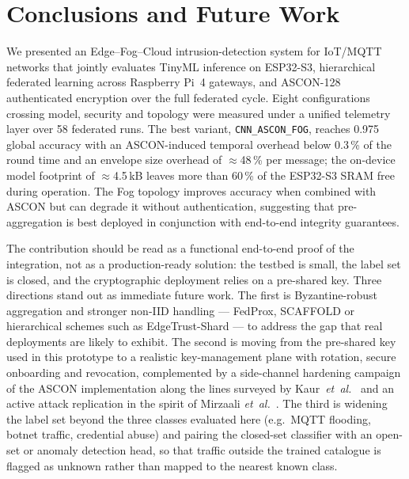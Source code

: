 \documentclass[runningheads]{llncs}
\begin{document}
\section{Conclusions and Future Work}
\label{sec:conclusion}

We presented an Edge--Fog--Cloud intrusion-detection system for IoT/MQTT
networks that jointly evaluates TinyML inference on ESP32-S3,
hierarchical federated learning across Raspberry Pi~4 gateways, and
ASCON-128 authenticated encryption over the full federated cycle. Eight
configurations crossing model, security and topology were measured under
a unified telemetry layer over 58 federated runs. The best variant,
\texttt{CNN\_ASCON\_FOG}, reaches 0.975 global accuracy with an
ASCON-induced temporal overhead below 0.3\,\% of the round time and an
envelope size overhead of $\approx$48\,\% per message; the on-device
model footprint of $\approx$4.5\,kB leaves more than 60\,\% of the
ESP32-S3 SRAM free during operation. The Fog topology improves accuracy
when combined with ASCON but can degrade it without authentication,
suggesting that pre-aggregation is best deployed in conjunction with
end-to-end integrity guarantees.

The contribution should be read as a functional end-to-end proof of the
integration, not as a production-ready solution: the testbed is small, the
label set is closed, and the cryptographic deployment relies on a
pre-shared key. Three directions stand out as immediate future work. The
first is Byzantine-robust aggregation and stronger non-IID handling ---
FedProx, SCAFFOLD or hierarchical schemes such as EdgeTrust-Shard
\cite{li2020fedprox,tran2026edgetrust} --- to address the gap that real
deployments are likely to exhibit. The second is moving from the
pre-shared key used in this prototype to a realistic key-management plane
with rotation, secure onboarding and revocation, complemented by a
side-channel hardening campaign of the ASCON implementation along the
lines surveyed by Kaur~\textit{et~al.}~\cite{kaur2025ascon} and an active
attack replication in the spirit of Mirzaali
\textit{et~al.}~\cite{mirzaali2025lwc}. The third is widening the label
set beyond the three classes evaluated here (e.g.\ MQTT flooding, botnet
traffic, credential abuse) and pairing the closed-set classifier with an
open-set or anomaly detection head, so that traffic outside the trained
catalogue is flagged as unknown rather than mapped to the nearest known
class.



\end{document}
